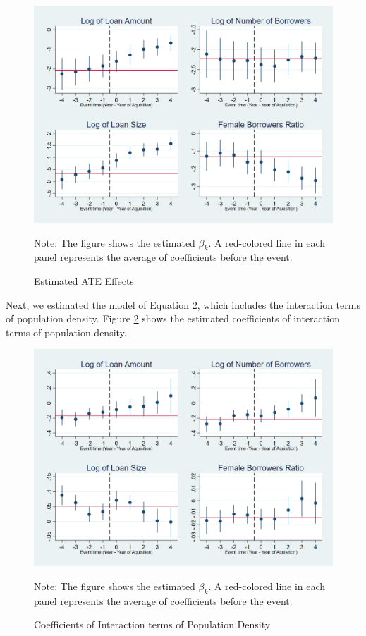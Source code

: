 \documentclass[a4j,12pt]{article}
\begin{document}
\begin{figure}[hbtp]
  \centering
  \caption{Estimated ATE Effects}
  \label{figure_Est1}
  \includegraphics[scale=0.2]{EventStudy.png}
     \\ 
  \footnotesize \raggedright Note: The figure shows the estimated $\beta_{k}$. A red-colored line in each panel represents the average of coefficients before the event.
\end{figure}



Next, we estimated the model of Equation 2, which includes the interaction terms of population density. Figure \ref{figure_Est2} shows the estimated coefficients of interaction terms of population density.  

\begin{figure}[hbtp]
  \centering
  \caption{Coefficients of Interaction terms of Population Density}
  \label{figure_Est2}
  \includegraphics[scale=0.2]{EventStudy2.png}
     \\ 
  \footnotesize \raggedright Note: The figure shows the estimated $\beta_{k}$. A red-colored line in each panel represents the average of coefficients before the event.
\end{figure}
\end{document}
